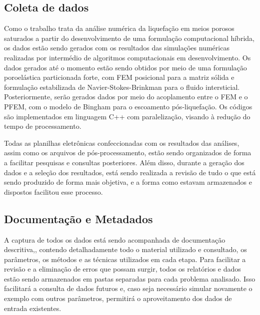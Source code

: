 \subsection{Coleta de dados}

Como o trabalho trata da análise numérica da liquefação em meios porosos saturados a partir do desenvolvimento de uma formulação computacional híbrida, os dados estão sendo gerados com os resultados das simulações numéricas realizadas por intermédio de algoritmos computacionais em desenvolvimento. Os dados gerados até o momento estão sendo obtidos por meio de uma formulação poroelástica particionada forte, com FEM posicional para a matriz sólida e formulação estabilizada de Navier-Stokes-Brinkman para o fluido intersticial. Posteriormente, serão gerados dados por meio do acoplamento entre o FEM e o PFEM, com o modelo de Bingham para o escoamento pós-liquefação. Os códigos são implementados em linguagem C++ com paralelização, visando à redução do tempo de processamento.

Todas as planilhas eletrônicas confeccionadas com os resultados das análises, assim como os arquivos de pós-processamento, estão sendo organizados de forma a facilitar pesquisas e consultas posteriores. Além disso, durante a geração dos dados e a seleção dos resultados, está sendo realizada a revisão de tudo o que está sendo produzido de forma mais objetiva, e a forma como estavam armazenados e dispostos facilitou esse processo.

\subsection{Documentação e Metadados}

A captura de todos os dados está sendo acompanhada de documentação descritiva,, contendo detalhadamente todo o material utilizado e consultado, os parâmetros, os métodos e as técnicas utilizados em cada etapa. Para facilitar a revisão e a eliminação de erros que possam surgir, todos os relatórios e dados estão sendo armazenados em pastas separadas para cada problema analisado. Isso facilitará a consulta de dados futuros e, caso seja necessário simular novamente o exemplo com outros parâmetros, permitirá o aproveitamento dos dados de entrada existentes.

